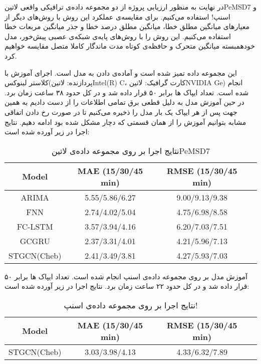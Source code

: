 
در نهایت به منظور ارزیابی پروژه از دو مجموعه داده‌ی ترافیکی واقعی ‌لاتین{PeMSD7} و اسنپ! استفاده می‌کنیم.
برای مقایسه‌ی عملکرد این روش با روش‌های دیگر از معیارهای میانگین مطلق خطا، میانگین مطلق درصد خطا و جذر میانگین مربعات خطا استفاده می‌کنیم.
این روش را با روش‌های پایه‌ی شبکه‌ی عصبی پیش‌خور، مدل خودهمبسته میانگین متحرک و حافظه‌ی کوتاه مدت ماندگار کاملا متصل  مقایسه خواهیم کرد.


این مجموعه داده تمیز شده است و آماده‌ی دادن به مدل است. اجرای آموزش با کلاستر لینوکس(پردازنده: ‌لاتین{Intel(R) C}، کارت گرافیک: ‌لاتین{NVIDIA Ge}) انجام شده است.
تعداد ایپاک ها برابر ۵۰ قرار داده شد و در کل حدود ۳۸ ساعت زمان برد.
در حین آموزش مدل به دلیل قطعی برق تمامی اطلاعات را از دست دادیم به همین جهت پس از هر ایپاک یک بار مدل را ذخیره می‌کنیم تا در صورت رخ دادن اتفاقی مشابه بتوانیم آموزش را از همان قسمتی که دچار مشکل شده بود ادامه دهیم. نتایج اجرا در زیر آورده شده است:

\begin{table}[h]
  \centering
  \caption{نتایج اجرا بر روی مجموعه داده‌ی ‌لاتین{PeMSD7}}
  \Large
  \begin{latin}\begin{tabular}{|c|c|c|c|}
    \hline
    Model & MAE (15/30/45 min) & RMSE (15/30/45 min) \\
    \hline
    ARIMA & 5.55/5.86/6.27 & 9.00/9.13/9.38 \\
    \hline
    FNN & 2.74/4.02/5.04 & 4.75/6.98/8.58 \\
    \hline
    FC-LSTM & 3.57/3.94/4.16 & 6.20/7.03/7.51 \\
    \hline
    GCGRU & 2.37/3.31/4.01 & 4.21/5.96/7.13 \\
    \hline
    STGCN(Cheb) & 2.41/3.49/3.81 & 4.27/5.93/7.03 \\
    \hline
  \end{tabular}\end{latin}
\end{table}


آموزش مدل بر روی مجموعه داده‌ی اسنپ انجام شده است. تعداد ایپاک ها برابر ۵۰ قرار داده شد و در کل حدود ۲۲ ساعت زمان برد. نتایج اجرا در زیر آورده شده است:

\begin{table}[h]
  \centering
  \caption{نتایج اجرا بر روی مجموعه داده‌ی اسنپ!}
  \Large
  \begin{latin}\begin{tabular}{|c|c|c|c|}
    \hline
    Model & MAE (15/30/45 min) & RMSE (15/30/45 min) \\
    \hline
    STGCN(Cheb) & 3.03/3.98/4.13 & 4.33/6.32/7.89 \\
    \hline
  \end{tabular}\end{latin}
\end{table}

